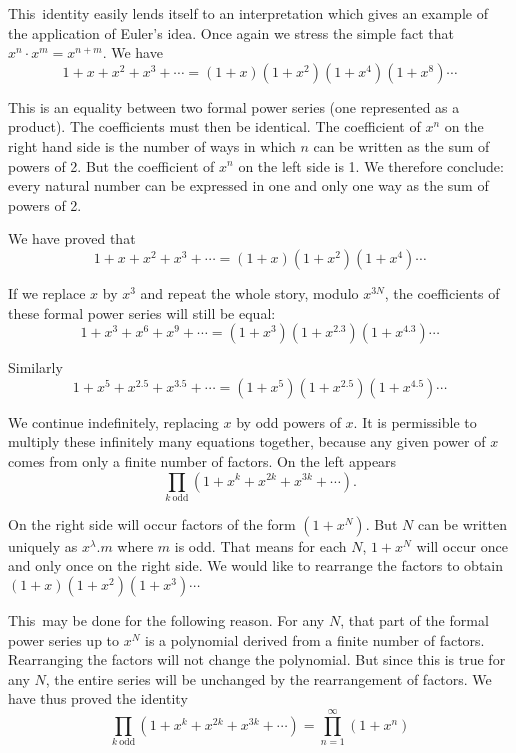 This\pageoriginale\  identity easily lends itself to an interpretation which gives an
example of the application of Euler's idea. Once again we stress the
simple fact that $x^n\cdot x^m= x^{n+m}$. We have
$$
1+x+x^2+x^3+ \cdots = (1+x)(1+x^2) (1+x^4) (1+x^8) \cdots
$$

This is an equality between two formal power series (one represented
as a product). The coefficients must then be identical. The
coefficient of $x^n$ on the right hand side is the number of ways in
which $n$ can be written as the sum of powers of 2. But the
coefficient of $x^n$ on the left side is 1. We therefore conclude:
every natural number can be expressed in one and only one way as the
sum of powers of 2. 

We have proved that
$$
1+x+x^2+x^3+ \cdots = (1+x)(1+x^2)(1+x^4) \cdots
$$

If we replace $x$ by $x^3$ and repeat the whole story, modulo
$x^{3N}$, the coefficients of these formal power series will still be
equal:
$$
1+x^3 + x^6 + x^9 + \cdots = (1+x^3)(1+x^{2.3}) (1+x^{4.3})\cdots
$$

Similarly
$$
1+x^5 + x^{2.5} + x^{3.5} + \cdots = (1+x^5)(1+x^{2.5}) (1+x^{4.5})\cdots
$$

We continue indefinitely, replacing $x$ by odd powers of $x$. It is
permissible to multiply these infinitely many equations together,
because any given power of $x$ comes from only a finite number of
factors. On the left appears 
$$
\prod\limits_{k ~\text{odd}} (1+x^k + x^{2k}+x^{3k} + \cdots).
$$ 

On the right side will occur factors of the form
$(1+x^N)$. But $N$ can be written uniquely as $x^\lambda. m$ where $m$
is odd. That means for each $N$, $1+x^N$ will occur once and only once
on the right side. We would like to rearrange the factors to obtain
$(1+x)(1+x^2)(1+x^3)\cdots$

This\pageoriginale\  may be done for the following reason. For any $N$, that part of
the formal power series up to $x^N$ is a polynomial derived from a
finite number of factors. Rearranging the factors will not change the
polynomial. But since this is true for any $N$, the entire series will
be unchanged by the rearrangement of factors. We have thus proved the
identity
\begin{equation*}
  \prod\limits_{k ~\text{odd}} (1+x^k + x^{2k}+x^{3k} +
  \cdots)=\prod\limits_{n=1}^\infty (1+x^n) \tag{1}\label{part1:lec1:eq1}
\end{equation*}

